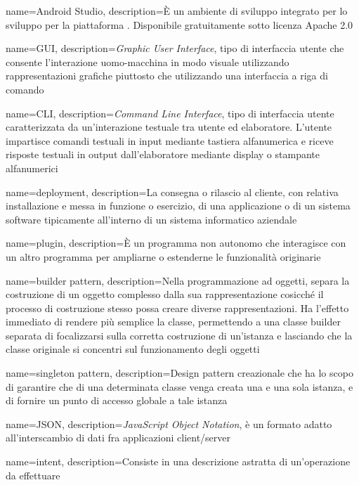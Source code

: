 {
	name=Android Studio,
	description={\`E un ambiente di sviluppo integrato per lo sviluppo per la piattaforma . Disponibile gratuitamente sotto licenza Apache 2.0}
}
	
{
	name=GUI,
	description={\emph{Graphic User Interface}, tipo di interfaccia utente che consente l'interazione uomo-macchina in modo visuale utilizzando rappresentazioni grafiche piuttosto che utilizzando una interfaccia a riga di comando}
}

{
	name=CLI,
	description={\emph{Command Line Interface}, tipo di interfaccia utente caratterizzata da un'interazione testuale tra utente ed elaboratore. L'utente impartisce comandi testuali in input mediante tastiera alfanumerica e riceve risposte testuali in output dall'elaboratore mediante display o stampante alfanumerici}
}

{
	name=deployment,
	description={La consegna o rilascio al cliente, con relativa installazione e messa in funzione o esercizio, di una applicazione o di un sistema software tipicamente all'interno di un sistema informatico aziendale}
}

{
	name=plugin,
	description={\`E un programma non autonomo che interagisce con un altro programma per ampliarne o estenderne le funzionalità originarie}
}

{
	name=builder pattern,
	description={Nella programmazione ad oggetti, separa la costruzione di un oggetto complesso dalla sua rappresentazione cosicché il processo di costruzione stesso possa creare diverse rappresentazioni. Ha l'effetto immediato di rendere più semplice la classe, permettendo a una classe builder separata di focalizzarsi sulla corretta costruzione di un'istanza e lasciando che la classe originale si concentri sul funzionamento degli oggetti}
}

{
	name=singleton pattern,
	description={Design pattern creazionale che ha lo scopo di garantire che di una determinata classe venga creata una e una sola istanza, e di fornire un punto di accesso globale a tale istanza}
}

{
	name=JSON,
	description={\emph{JavaScript Object Notation}, è un formato adatto all'interscambio di dati fra applicazioni client/server}
}

{
	name=intent,
	description={Consiste in una descrizione astratta di un'operazione da effettuare}
}

